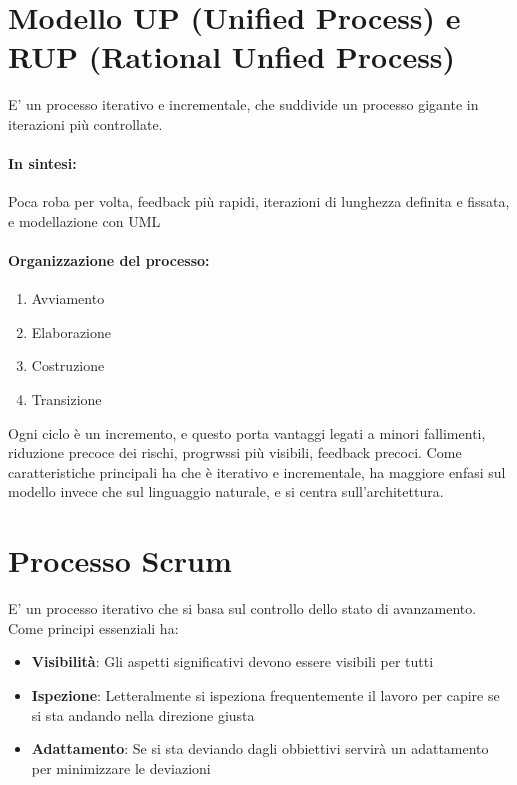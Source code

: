 \documentclass[12pt, a4paper, openany, twoside]{book}
\begin{document}
\section{Modello UP (Unified Process) e RUP (Rational Unfied Process)}
E' un processo iterativo e incrementale, che suddivide un processo gigante in 
iterazioni più controllate. 
\paragraph{In sintesi:} Poca roba per volta, feedback più rapidi, iterazioni
di lunghezza definita e fissata, e modellazione con UML
\paragraph{Organizzazione del processo:}
\begin{enumerate}
	\item Avviamento
	\item Elaborazione
	\item Costruzione
	\item Transizione 
\end{enumerate}
Ogni ciclo è un incremento, e questo porta vantaggi legati a minori fallimenti,
riduzione precoce dei rischi, progrwssi più visibili, feedback precoci. 
Come caratteristiche principali ha che è iterativo e incrementale, ha maggiore enfasi
sul modello invece che sul linguaggio naturale, e si centra sull'architettura.\\
\section{Processo Scrum}
E' un processo iterativo che si basa sul controllo dello stato di avanzamento.
Come principi essenziali ha:
\begin{itemize}
	\item \textbf{Visibilità}: Gli aspetti significativi devono essere visibili
	per tutti
	\item \textbf{Ispezione}: Letteralmente si ispeziona frequentemente il lavoro
	per capire se si sta andando nella direzione giusta
	\item \textbf{Adattamento}: Se si sta deviando dagli obbiettivi servirà
	un adattamento per minimizzare le deviazioni
\end{itemize}
\end{document}
